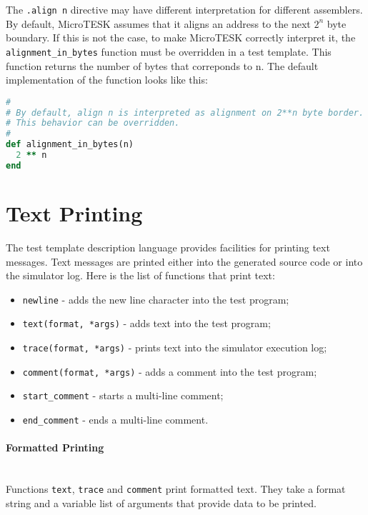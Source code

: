 \documentclass[oneside,final,12pt]{extreport}
\begin{document}
The \texttt{.align n} directive may have different interpretation for different assemblers.
By default, MicroTESK assumes that it aligns an address to the next $2^n$ byte boundary.
If this is not the case, to make MicroTESK correctly interpret it,
the \texttt{alignment{\_}in{\_}bytes} function must be overridden in a test template.
This function returns the number of bytes that correponds to n. The default implementation
of the function looks like this:

\begin{lstlisting}[language=ruby]
#
# By default, align n is interpreted as alignment on 2**n byte border.
# This behavior can be overridden.
#
def alignment_in_bytes(n)
  2 ** n
end
\end{lstlisting}


\section{Text Printing}

The test template description language provides facilities for printing text messages.
Text messages are printed either into the generated source code or into the simulator log.
Here is the list of functions that print text:

\begin{itemize}
\item \texttt{newline} - adds the new line character into the test program;
\item \texttt{text(format, *args)} - adds text into the test program;
\item \texttt{trace(format, *args)} - prints text into the simulator execution log;
\item \texttt{comment(format, *args)} - adds a comment into the test program;
\item \texttt{start{\_}comment} - starts a multi-line comment;
\item \texttt{end{\_}comment} - ends a multi-line comment.
\end{itemize}

\paragraph{Formatted Printing} ~\\

Functions \texttt{text}, \texttt{trace} and \texttt{comment} print formatted text.
They take a format string and a variable list of arguments that provide data to be
printed.
\end{document}
